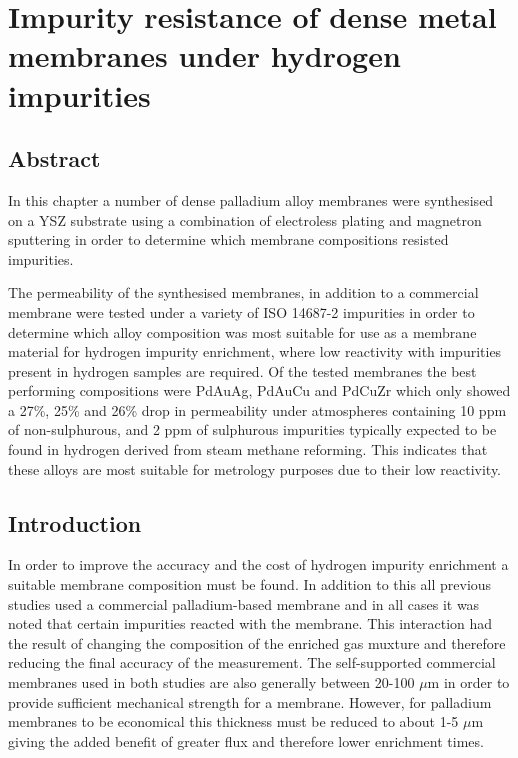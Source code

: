 

\chapter{Impurity resistance of dense metal membranes under hydrogen impurities}
\section {Abstract}
In this chapter a number of dense palladium alloy membranes were synthesised on a YSZ substrate using a combination of electroless plating and magnetron sputtering in order to determine which membrane compositions resisted impurities. 

The permeability of the synthesised membranes, in addition to a commercial membrane were tested under a variety of ISO 14687-2 impurities in order to determine which alloy composition was most suitable for use as a membrane material for hydrogen impurity enrichment, where low reactivity with impurities present in hydrogen samples are required. Of the tested membranes the best performing compositions were PdAuAg, PdAuCu and PdCuZr which only showed a 27\%, 25\% and 26\% drop in permeability under atmospheres containing 10 ppm of non-sulphurous, and 2 ppm of sulphurous impurities typically expected to be found in hydrogen derived from steam methane reforming.  This indicates that these alloys are most suitable for metrology purposes due to their low reactivity. 

\section{Introduction}
In order to improve the accuracy and the cost of hydrogen impurity enrichment a suitable membrane composition must be found. In addition to this all previous studies used a commercial palladium-based membrane and in all cases it was noted that certain impurities reacted with the membrane. This interaction had the result of changing the composition of the enriched gas muxture and therefore reducing the final accuracy of the measurement. \cite{Murugan2014, Ahmed2010} The self-supported commercial membranes used in both studies are also generally between 20-100 $\mu$m in order to provide sufficient mechanical strength for a membrane. However, for palladium membranes to be economical this thickness must be reduced to about 1-5 $\mu$m giving the added benefit of greater flux and therefore lower enrichment times. 

